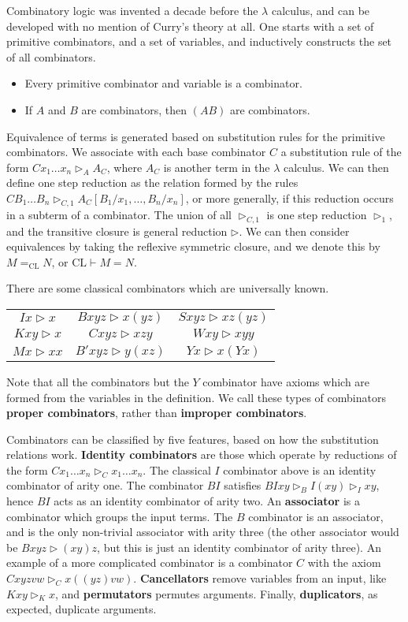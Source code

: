 Combinatory logic was invented a decade before the $\lambda$ calculus, and can be developed with no mention of Curry's theory at all. One starts with a set of primitive combinators, and a set of variables, and inductively constructs the set of all combinators.
%
\begin{itemize}
    \item Every primitive combinator and variable is a combinator.
    \item If $A$ and $B$ are combinators, then $(AB)$ are combinators.
\end{itemize}
%
Equivalence of terms is generated based on substitution rules for the primitive combinators. We associate with each base combinator $C$ a substitution rule of the form $Cx_1 \dots x_n \rhd_A A_C$, where $A_C$ is another term in the $\lambda$ calculus. We can then define one step reduction as the relation formed by the rules $CB_1 \dots B_n \rhd_{C,1} A_C[B_1/x_1, \dots, B_n/x_n]$, or more generally, if this reduction occurs in a subterm of a combinator. The union of all $\rhd_{C,1}$ is one step reduction $\rhd_1$, and the transitive closure is general reduction $\rhd$. We can then consider equivalences by taking the reflexive symmetric closure, and we denote this by $M =_{\text{CL}} N$, or $\text{CL} \vdash M = N$.

\begin{example}
    There are some classical combinators which are universally known.
    \begin{center}
    \begin{tabular}{ c c c }
    $Ix \rhd x$ & $Bxyz \rhd x(yz)$ & $Sxyz \rhd xz(yz)$ \\ 
    $Kxy \rhd x$ & $Cxyz \rhd xzy$ & $Wxy \rhd xyy$ \\  
    $Mx \rhd xx$ & $B'xyz \rhd y(xz)$ & $Yx \rhd x(Yx)$
    \end{tabular}
    \end{center}
    Note that all the combinators but the $Y$ combinator have axioms which are formed from the variables in the definition. We call these types of combinators {\bf proper combinators}, rather than {\bf improper combinators}.
\end{example}

Combinators can be classified by five features, based on how the substitution relations work. {\bf Identity combinators} are those which operate by reductions of the form $Cx_1 \dots x_n \rhd_C x_1 \dots x_n$. The classical $I$ combinator above is an identity combinator of arity one. The combinator $BI$ satisfies $BIxy \rhd_B I(xy) \rhd_I xy$, hence $BI$ acts as an identity combinator of arity two. An {\bf associator} is a combinator which groups the input terms. The $B$ combinator is an associator, and is the only non-trivial associator with arity three (the other associator would be $Bxyz \rhd (xy)z$, but this is just an identity combinator of arity three). An example of a more complicated combinator is a combinator $C$ with the axiom $Cxyzvw \rhd_C x((yz)vw)$. {\bf Cancellators} remove variables from an input, like $Kxy \rhd_K x$, and {\bf permutators} permutes arguments. Finally, {\bf duplicators}, as expected, duplicate arguments.

